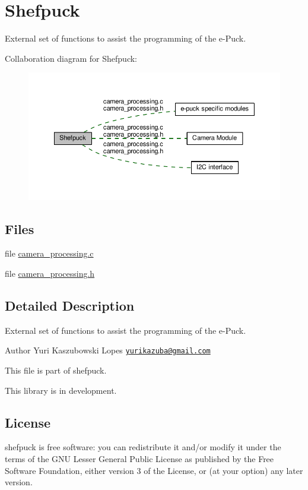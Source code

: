 \hypertarget{group__shefpuck}{}\section{Shefpuck}
\label{group__shefpuck}


External set of functions to assist the programming of the e-\/\+Puck.  


Collaboration diagram for Shefpuck\+:\nopagebreak
\begin{figure}[H]
\begin{center}
\leavevmode
\includegraphics[width=350pt]{d9/d96/group__shefpuck}
\end{center}
\end{figure}
\subsection*{Files}
\begin{DoxyCompactItemize}
\item 
file \hyperlink{camera__processing_8c}{camera\+\_\+processing.\+c}
\item 
file \hyperlink{camera__processing_8h}{camera\+\_\+processing.\+h}
\end{DoxyCompactItemize}


\subsection{Detailed Description}
External set of functions to assist the programming of the e-\/\+Puck. 

\begin{DoxyAuthor}{Author}
Yuri Kaszubowski Lopes \href{mailto:yurikazuba@gmail.com}{\tt yurikazuba@gmail.\+com}
\end{DoxyAuthor}
This file is part of shefpuck.

This library is in development.\hypertarget{group__shefpuck_License}{}\subsection{License}\label{group__shefpuck_License}
shefpuck is free software\+: you can redistribute it and/or modify it under the terms of the G\+N\+U Lesser General Public License as published by the Free Software Foundation, either version 3 of the License, or (at your option) any later version.

